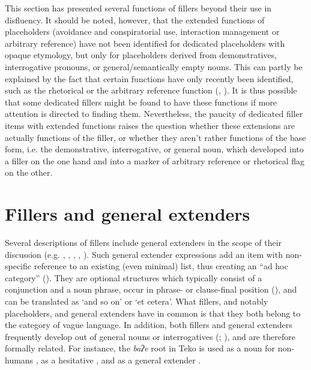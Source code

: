 \documentclass[output=paper]{langscibook}
\begin{document}
This section has presented several functions of fillers beyond their use in disfluency. It should be noted, however, that the extended functions of placeholders (avoidance and conspiratorial use, interaction management or arbitrary reference) have not been identified for dedicated placeholders with opaque etymology, but only for placeholders derived from demonstratives, interrogative pronouns, or general/semantically empty nouns. This can partly be explained by the fact that certain functions have only recently been identified, such as the rhetorical or the arbitrary reference function (\citealt{Seraku2022a}, \citeyear{Seraku2022b}). It is thus possible that some dedicated fillers might be found to have these functions if more attention is directed to finding them. Nevertheless, the paucity of dedicated filler items with extended functions raises the question whether these extensions are actually functions of the filler, or whether they aren’t rather functions of the base form, i.e. the demonstrative, interrogative, or general noun, which developed into a filler on the one hand and into a marker of arbitrary reference or rhetorical flag on the other.

\section{Fillers and general extenders}\label{sec:intro:6}

Several descriptions of fillers include general extenders in the scope of their discussion (e.g. \citealt[573--575]{Aikhenvald2008}, \citealt{Ganenkov2010}, \citealt{Maisak2023}, \citealt{chapters/klyachko}, \citealt{chapters/rose}). Such general extender expressions add an item with non-specific reference to an existing (even minimal) list, thus creating an “ad hoc category” (\citealt{Mauri2018}). They are optional structures which typically consist of a conjunction and a noun phrase, occur in phrase- or clause-final position (\citealt[1]{Overstreet2021}), and can be translated as ‘and so on’ or ‘et cetera’. What fillers, and notably placeholders, and general extenders have in common is that they both belong to the category of vague language. In addition, both fillers and general extenders frequently develop out of general nouns or interrogatives (\citealt{Hayashi2006}; \citealt[28]{Mauri2018}), and are therefore formally related. For instance, the \textit{baʔe} root in Teko is used as a noun for non-humans , as a hesitative , and as a general extender .
\end{document}
